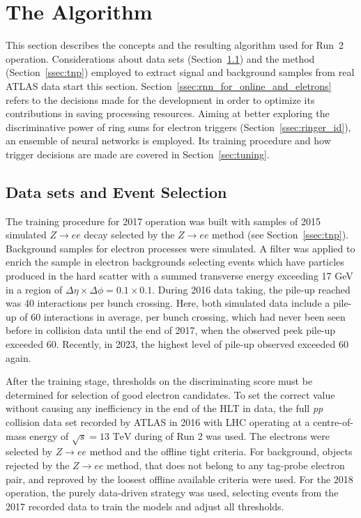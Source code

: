 \chapter{The \rnn{} Algorithm}%
\label{sec:neuralringer}

This section describes the \rnn{} concepts and the resulting algorithm used for Run~2
operation. Considerations about data sets (Section~\ref{ssec:dataset}) and the \TnP method
(Section~\ref{ssec:tnp}) employed to extract signal and background samples
from real ATLAS data start this section. Section~\ref{ssec:rnn_for_online_and_eletrons} refers to the
decisions made for the \rnn{} development in order to optimize its contributions in saving processing resources. Aiming at better exploring the discriminative
power of ring sums for electron triggers (Section~\ref{ssec:ringer_id}),
an ensemble of neural networks is employed. Its training procedure and how trigger decisions are made are covered in Section~\ref{sec:tuning}.




\section{Data sets and Event Selection}%
\label{ssec:dataset}

The training procedure for 2017 operation was built with samples of 2015 simulated $Z\rightarrow ee$ decay selected by the $Z\rightarrow ee$ \TnP method (see Section~\ref{ssec:tnp}). Background samples for electron processes were simulated. A filter was applied to enrich the sample in electron backgrounds selecting events which have particles produced in the hard scatter with a summed transverse energy exceeding 17 GeV in a region of $\Delta\eta\times\Delta\phi=0.1\times0.1$. During 2016 data taking, the pile-up reached was 40 interactions per bunch crossing.
Here, both simulated data include a pile-up of 60 interactions in average, per bunch crossing, which had never been seen before in collision data until the end of 2017, when the observed peek pile-up exceeded 60. Recently, in 2023, the highest level of pile-up observed exceeded 60 again.

After the training stage, thresholds on the discriminating score must be determined for selection of good electron candidates. To set the correct value without causing any inefficiency in the end of the HLT in data, the full \textit{pp} collision data set recorded by ATLAS in 2016 with LHC operating at a centre-of-mass energy of $\sqrt{s}=13\text{ TeV}$ during of Run 2 was used. The electrons were selected by $Z\rightarrow ee$ \TnP method and the offline tight criteria. For background, objects rejected by the $Z\rightarrow ee$ \TnP method, that does not belong to any tag-probe electron pair, and reproved by the loosest offline available criteria were used. For the 2018 operation, the purely data-driven strategy was used, selecting events from the 2017 recorded data to train the models and adjust all thresholds.

